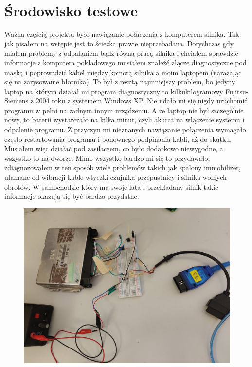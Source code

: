 \documentclass[declaration,shortabstract, inz]{iithesis}
\begin{document}
\section{Środowisko testowe} %
    Ważną częścią projektu było nawiązanie połączenia z komputerem silnika. Tak jak pisałem na wstępie jest to ścieżka prawie nieprzebadana. Dotychczas gdy miałem problemy z odpalaniem bądź równą pracą silnika i chciałem sprawdzić informacje z komputera pokładowego musiałem znaleźć złącze diagnostyczne pod maską i poprowadzić kabel między komorą silnika a moim laptopem (narażając się na zarysowanie błotnika). To był z resztą najmniejszy problem, bo jedyny laptop na którym działał mi program diagnostyczny to kilkukilogramowy Fujitsu-Siemens z 2004 roku z systemem Windows XP. Nie udało mi się nigdy uruchomić programu w pełni na żadnym innym urządzeniu. A że laptop nie był szczególnie nowy, to baterii wystarczało na kilka minut, czyli akurat na włączenie systemu i odpalenie programu. Z przyczyn mi nieznanych nawiązanie połączenia wymagało często restartowania programu i ponownego podpinania kabli, aż do skutku. Musiałem więc działać pod zasilaczem, co było dodatkowo niewygodne, a wszystko to na dworze. Mimo wszystko bardzo mi się to przydawało, zdiagnozowałem w ten sposób wiele problemów takich jak spalony immobilizer, ułamane od wibracji kable wtyczki czujnika przepustnicy i silnika wolnych obrotów. W samochodzie który ma swoje lata i przekładany silnik takie informacje okazują się być bardzo przydatne.
    
    \begin{figure}[htp]
        \centering
        \includegraphics[width=12cm]{images/test_setup_far.jpg}
        \label{fig:test_setup_far}
    \end{figure}
    \FloatBarrier
    
\end{document}
